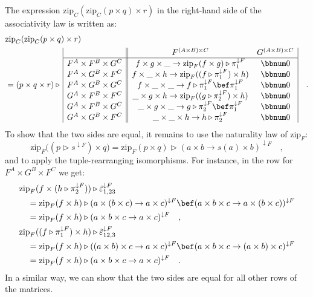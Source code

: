 The expression $\text{zip}_{C}(\text{zip}_{C}(p\times q)\times r)$
in the right-hand side of the associativity law is written as:
\begin{align*}
 & \text{zip}_{C}(\text{zip}_{C}(p\times q)\times r)\\
 & =(p\times q\times r)\triangleright\,\begin{array}{|c||cc|}
 & F^{(A\times B)\times C} & G^{(A\times B)\times C}\\
\hline F^{A}\times F^{B}\times G^{C} & f\times g\times\_\rightarrow\text{zip}_{F}(f\times g)\triangleright\pi_{1}^{\downarrow F} & \bbnum 0\\
F^{A}\times G^{B}\times F^{C} & f\times\_\times h\rightarrow\text{zip}_{F}((f\triangleright\pi_{1}^{\downarrow F})\times h) & \bbnum 0\\
F^{A}\times G^{B}\times G^{C} & f\times\_\times\_\rightarrow f\triangleright\pi_{1}^{\downarrow F}\bef\pi_{1}^{\downarrow F} & \bbnum 0\\
G^{A}\times F^{B}\times F^{C} & \_\times g\times h\rightarrow\text{zip}_{F}((g\triangleright\pi_{2}^{\downarrow F})\times h) & \bbnum 0\\
G^{A}\times F^{B}\times G^{C} & \_\times g\times\_\rightarrow g\triangleright\pi_{2}^{\downarrow F}\bef\pi_{1}^{\downarrow F} & \bbnum 0\\
G^{A}\times G^{B}\times F^{C} & \_\times\_\times h\rightarrow h\triangleright\pi_{2}^{\downarrow F} & \bbnum 0
\end{array}\quad.
\end{align*}
 To show that the two sides are equal, it remains to use the naturality
law of $\text{zip}_{F}$:
\[
\text{zip}_{F}\big((p\triangleright s^{\downarrow F})\times q\big)=\text{zip}_{F}(p\times q)\triangleright(a\times b\rightarrow s(a)\times b)^{\downarrow F}\quad,
\]
and to apply the tuple-rearranging isomorphisms. For instance, in
the row for $F^{A}\times G^{B}\times F^{C}$ we get:
\begin{align*}
 & \text{zip}_{F}(f\times(h\triangleright\pi_{2}^{\downarrow F}))\triangleright\tilde{\varepsilon}_{1,23}^{\downarrow F}\\
 & \quad=\text{zip}_{F}(f\times h)\triangleright(a\times(b\times c)\rightarrow a\times c)^{\downarrow F}\bef(a\times b\times c\rightarrow a\times(b\times c))^{\downarrow F}\\
 & \quad=\text{zip}_{F}(f\times h)\triangleright(a\times b\times c\rightarrow a\times c)^{\downarrow F}\quad,\\
 & \text{zip}_{F}((f\triangleright\pi_{1}^{\downarrow F})\times h)\triangleright\tilde{\varepsilon}_{12,3}^{\downarrow F}\\
 & \quad=\text{zip}_{F}(f\times h)\triangleright((a\times b)\times c\rightarrow a\times c)^{\downarrow F}\bef(a\times b\times c\rightarrow(a\times b)\times c)^{\downarrow F}\\
 & \quad=\text{zip}_{F}(f\times h)\triangleright(a\times b\times c\rightarrow a\times c)^{\downarrow F}\quad.
\end{align*}
In a similar way, we can show that the two sides are equal for all
other rows of the matrices.

